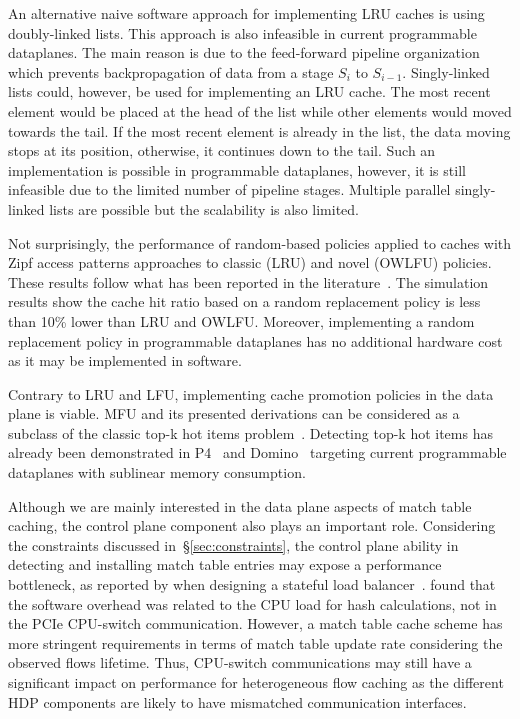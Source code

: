 An alternative naive software approach for implementing LRU caches is using doubly-linked lists.
This approach is also infeasible in current programmable dataplanes.
The main reason is due to the feed-forward pipeline organization which prevents backpropagation of data from a stage $S_{i}$ to $S_{i-1}$.
Singly-linked lists could, however, be used for implementing an LRU cache.
The most recent element would be placed at the head of the list while other elements would moved towards the tail.
If the most recent element is already in the list, the data moving stops at its position, otherwise, it continues down to the tail.
Such an implementation is possible in programmable dataplanes, however, it is still infeasible due to the limited number of pipeline stages.%
Multiple parallel singly-linked lists are possible but the scalability is also limited.

Not surprisingly, the performance of random-based policies applied to caches with Zipf access patterns approaches to classic (LRU) and novel (OWLFU) policies.
These results follow what has been reported in the literature~\cite{Gallo:2014}.
The simulation results show the cache hit ratio based on a random replacement policy is less than 10\% lower than LRU and OWLFU.
Moreover, implementing a random replacement policy in programmable dataplanes has no additional hardware cost as it may be implemented in software.

Contrary to LRU and LFU, implementing cache promotion policies in the data plane is viable.
MFU and its presented derivations can be considered as a subclass of the classic top-k hot items problem~\cite{Metwally:2005}.
Detecting top-k hot items has already been demonstrated in P4~\cite{Sivaraman:17} and Domino~\cite{SivaramanDomino:2016} targeting current programmable dataplanes with sublinear memory consumption.

Although we are mainly interested in the data plane aspects of match table caching, the control plane component also plays an important role.
Considering the constraints discussed in~\S\ref{sec:constraints}, the control plane ability in detecting and installing match table entries may expose a performance bottleneck, as reported by \citeauthor{Miao:2017} when designing a stateful load balancer~\cite{Miao:2017}.
\citeauthor{Miao:2017} found that the software overhead was related to the CPU load for hash calculations, not in the PCIe CPU-switch communication.
However, a match table cache scheme has more stringent requirements in terms of match table update rate considering the observed flows lifetime.
Thus, CPU-switch communications may still have a significant impact on performance for heterogeneous flow caching as the different HDP components are likely to have mismatched communication interfaces.

